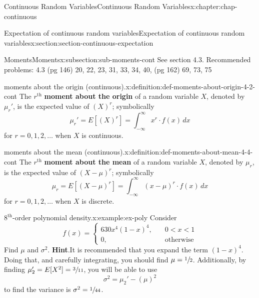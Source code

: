 \documentclass[oneside,10pt,]{book}
\newcommand{\blocktitlefont}{\relax}
\newcommand{\terminology}[1]{\textbf{#1}}
\numberwithin{equation}{section}
\newcommand{\lt}{<}
\newcommand{\amp}{&}
\begin{document}
\begin{chapterptx}{Continuous Random Variables}{}{Continuous Random Variables}{}{}{x:chapter:chap-continuous}
\begin{sectionptx}{Expectation of continuous random variables}{}{Expectation of continuous random variables}{}{}{x:section:section-continuous-expectation}
%
\begin{subsectionptx}{Moments}{}{Moments}{}{}{x:subsection:sub-moments-cont}
See section 4.3. Recommended problems: 4.3 (pg 146) 20, 22, 23, 31, 33, 34, 40, (pg 162) 69, 73, 75%
\begin{definition}{moments about the origin (continuous).}{x:definition:def-moments-about-origin-4-2-cont}%
The \(r^\text{th}\) \terminology{moment about the origin} of a random variable \(X\), denoted by \(\mu_r'\), is the expected value of \((X)^r\); symbolically%
\begin{equation*}
\mu_r'=E[(X)^r] = \int_{-\infty}^\infty x^r\cdot f(x)\,dx
\end{equation*}
for \(r = 0,1,2,
\dots\) when \(X\) is continuous.%
\end{definition}
\begin{definition}{moments about the mean (continuous).}{x:definition:def-moments-about-mean-4-4-cont}%
The \(\displaystyle r^\text{th}\) \terminology{moment about the mean} of a random variable \(X\), denoted by \(\displaystyle \mu_r\), is the expected value of \(\displaystyle
(X-\mu)^r\); symbolically%
\begin{equation*}
\mu_r=E[(X-\mu)^r] = \int_{-\infty}^\infty (x-\mu)^r\cdot
f(x)\,dx
\end{equation*}
for \(\displaystyle r =
0,1,2, \dots\) when \(X\) is discrete.%
\end{definition}
\begin{example}{\(8^{\text{th}}\)-order polynomial density.}{x:example:ex-poly}%
Consider%
\begin{equation*}
f(x) = \begin{cases}630x^4(1-x)^4, \amp \quad 0 \lt x \lt
1\\ 0, \amp \quad
\text{otherwise}\end{cases}
\end{equation*}
Find \(\mu\) and \(\sigma^2\).%
\textbf{\blocktitlefont Hint}.\quad{}It is recommended that you expand the term \((1-x)^4\).  Doing that, and carefully integrating, you should find \(\mu =
\sfrac{1}{2}\). Additionally, by finding \(\mu_2' = E[X^2] =
\sfrac{3}{11}\), you will be able to use%
\begin{equation*}
\sigma^2 = \mu_2' -
(\mu)^2
\end{equation*}
to find the variance is \(\sigma^2 = \sfrac{1}{44}\).%
\end{example}
\end{subsectionptx}
%
%
\typeout{************************************************}

\end{sectionptx}
\end{chapterptx}
\end{document}

